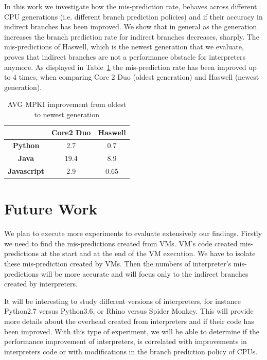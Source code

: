 \documentclass[parskip=full, paper=a4, fontsize=12pt]{scrartcl}
\numberwithin{equation}{section}
\numberwithin{figure}{section}
\numberwithin{table}{section}
\begin{document}
In this work we investigate how the mis-prediction rate, behaves across different CPU generations (i.e. different branch prediction policies) and if their accuracy in indirect branches has been improved. We show that in general as the generation increases the branch prediction rate for indirect branches decreases, sharply. The mis-predictions of Haswell, which is the newest generation that we evaluate, proves that indirect branches are not a performance obstacle for interpreters anymore. As displayed in Table~\ref{mpkiimprovement} the mis-prediction rate has been improved up to 4 times, when comparing Core 2 Duo (oldest generation) and Haswell (newest generation).    

\begin{table}[]
	\centering
		\begin{tabular}{@{}|c|c|c|@{}}
			\toprule
			\textbf{}           & \textbf{Core2 Duo} & \textbf{Haswell} \\ \midrule
			\textbf{Python}     & 2.7                & 0.7              \\ \midrule
			\textbf{Java}       & 19.4               & 8.9              \\ \midrule
			\textbf{Javascript} & 2.9                & 0.65             \\ \bottomrule
		\end{tabular}
	\caption{AVG MPKI improvement from oldest to newest generation}
	\label{mpkiimprovement}
\end{table}
\section{Future Work}
We plan to execute more experiments to evaluate extensively our findings.
Firstly we need to find the mis-predictions created from VMs. VM's code created mis-predictions at the start and at the end of the
VM execution. We have to isolate these mis-prediction created by
VMs. Then the numbers of interpreter's mis-predictions will be more
accurate and will focus only to the indirect branches created by interpreters. 

It will be interesting to study different versions of interpreters, for instance Python2.7 versus Python3.6, or Rhino versus Spider Monkey. This will provide more details about the overhead created from interpreters and if their code has been improved. With this type of experiment, we will be able to determine
if the performance improvement of interpreters, is correlated with improvements in interpreters code or with modifications in the branch prediction policy of CPUs.  
\end{document}
